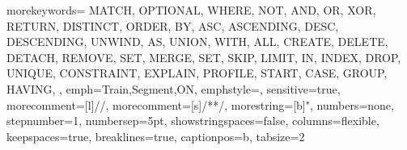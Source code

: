 {
	morekeywords={
		MATCH, OPTIONAL, WHERE, NOT, AND, OR, XOR, RETURN, DISTINCT, ORDER, BY, ASC, ASCENDING, DESC, DESCENDING, UNWIND, AS, UNION, WITH, ALL, CREATE, DELETE, DETACH, REMOVE, SET, MERGE, SET, SKIP, LIMIT, IN,
		INDEX, DROP, UNIQUE, CONSTRAINT, EXPLAIN, PROFILE, START, CASE,
		GROUP, HAVING,
	},
	emph={Train,Segment,ON},
	emphstyle={\color{emphColor}},
	sensitive=true,
	morecomment=[l]{//},
	morecomment=[s]{/*}{*/},
	morestring=[b]{"},
	numbers=none,
	stepnumber=1,
	numbersep=5pt,
	showstringspaces=false,
	columns=flexible,
	keepspaces=true,
	breaklines=true,	
	captionpos=b,
	tabsize=2
}
\newcommand{\cypherStyle}[1]{\lstinline[style=cypherbig]@#1@}


